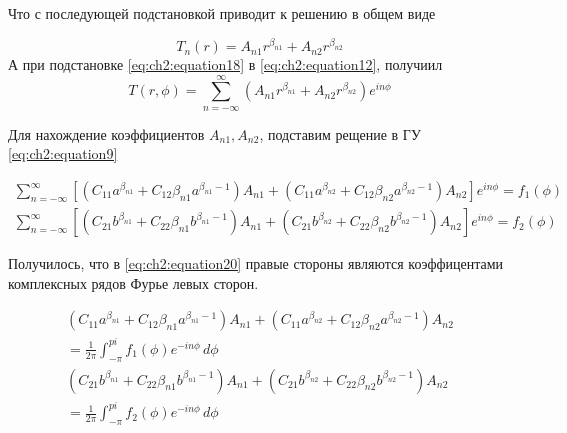 Что с последующей подстановкой приводит к решению в общем виде

\begin{equation}
	\label{eq:ch2:equation18}
	T_n(r) = A_{n1} r^{\beta_{n1}} + A_{n2} r^{\beta_{n2}}
\end{equation}
А при подстановке \cref{eq:ch2:equation18} в \cref{eq:ch2:equation12}, получиил
\begin{equation}
	\label{eq:ch2:equation19}
	T(r, \phi) = \sum_{n=-\infty}^{\infty} \left ( A_{n1} r^{\beta_{n1}} + A_{n2} r^{\beta_{n2}} \right ) e^{in\phi}
\end{equation}

Для нахождение коэффициентов \(A_{n1}, A_{n2}\), подставим рещение в ГУ \cref{eq:ch2:equation9}

\begin{equation}
	\label{eq:ch2:equation20}
	\begin{split}
		\sum_{n=-\infty}^{\infty} \left [ \left (C_{11} a^{\beta_{n1}} +C_{12} \beta_{n1} a^{\beta_{n1} -1} \right ) A_{n1}  +\left (C_{11} a^{\beta_{n2}} +C_{12} \beta_{n2} a^{\beta_{n2} -1} \right ) A_{n2} \right ] e^{in\phi} = f_1(\phi) \\
		\sum_{n=-\infty}^{\infty} \left [ \left (C_{21} b^{\beta_{n1}} +C_{22} \beta_{n1} b^{\beta_{n1} -1} \right ) A_{n1}  +\left (C_{21} b^{\beta_{n2}} +C_{22} \beta_{n2} b^{\beta_{n2} -1} \right ) A_{n2} \right ] e^{in\phi} = f_2(\phi)
	\end{split}
\end{equation}
 
 Получилось, что в \cref{eq:ch2:equation20} правые стороны являются коэффицентами комплексных рядов Фурье левых сторон.
 
 \begin{equation}
 	\label{eq:ch2:equation21}
 	\begin{split}
 		\left (C_{11} a^{\beta_{n1}} +C_{12} \beta_{n1} a^{\beta_{n1} -1} \right ) A_{n1}  +\left (C_{11} a^{\beta_{n2}} +C_{12} \beta_{n2} a^{\beta_{n2} -1} \right ) A_{n2} \\ = \frac{1}{2\pi} \int_{-\pi}^{pi}f_1(\phi)e^{-in\phi}\,d\phi \\
 		\left (C_{21} b^{\beta_{n1}} +C_{22} \beta_{n1} b^{\beta_{n1} -1} \right ) A_{n1}  +\left (C_{21} b^{\beta_{n2}} +C_{22} \beta_{n2} b^{\beta_{n2} -1} \right ) A_{n2} \\ = \frac{1}{2\pi} \int_{-\pi}^{pi}f_2(\phi)e^{-in\phi}\,d\phi
 	\end{split}
 \end{equation}
 
